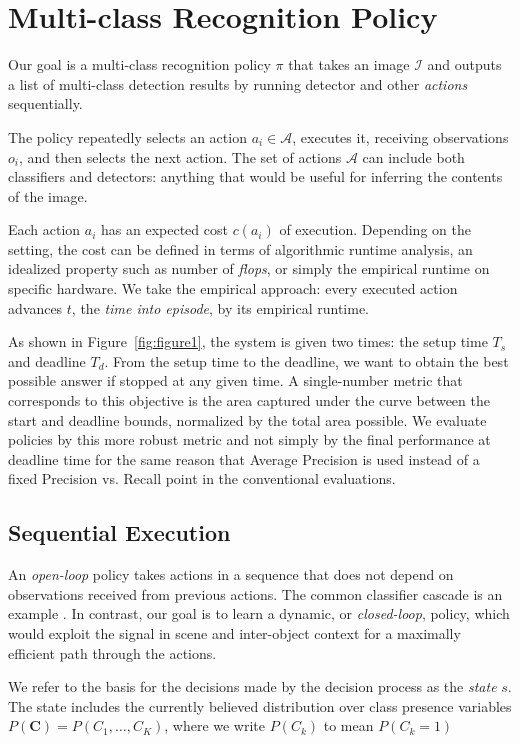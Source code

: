 
\section{Multi-class Recognition Policy} \label{sec:tech}

Our goal is a multi-class recognition policy $\pi$ that takes an image $\mathcal{I}$ and outputs a list of multi-class detection results by running detector and other \emph{actions} sequentially.

The policy repeatedly selects an action $a_i \in \mathcal{A}$, executes it, receiving observations $o_i$, and then selects the next action.
The set of actions $\mathcal{A}$ can include both classifiers and detectors: anything that would be useful for inferring the contents of the image.

Each action $a_i$ has an expected cost $c(a_i)$ of execution.
Depending on the setting, the cost can be defined in terms of algorithmic runtime analysis, an idealized property such as number of \emph{flops}, or simply the empirical runtime on specific hardware.
We take the empirical approach: every executed action advances $t$, the \emph{time into episode}, by its empirical runtime.

As shown in Figure~\ref{fig:figure1}, the system is given two times: the setup time $T_s$ and deadline $T_d$.
From the setup time to the deadline, we want to obtain the best possible answer if stopped at any given time.
A single-number metric that corresponds to this objective is the area captured under the curve between the start and deadline bounds, normalized by the total area possible.
We evaluate policies by this more robust metric and not simply by the final performance at deadline time for the same reason that Average Precision is used instead of a fixed Precision vs. Recall point in the conventional evaluations.

\subsection{Sequential Execution}
An \emph{open-loop} policy takes actions in a sequence that does not depend on observations received from previous actions.
The common classifier cascade is an example \cite{Viola2001}.
In contrast, our goal is to learn a dynamic, or \emph{closed-loop}, policy, which would exploit the signal in scene and inter-object context for a maximally efficient path through the actions.

We refer to the basis for the decisions made by the decision process as the \emph{state} $s$.
The state includes the currently believed distribution over class presence variables $P(\mathbf{C}) = P(C_1, \dots, C_K)$, where we write $P(C_k)$ to mean $P(C_k=1)$

